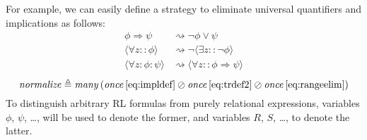 \documentclass{llncs}
\begin{document}
For example, we can easily define a strategy to eliminate universal
quantifiers and implications as follows:
\begin{align}
\phi \Rightarrow \psi & \rightsquigarrow \neg \phi \vee \psi \label{eq:impldef} \\
\langle \forall z :: \phi \rangle & \rightsquigarrow \neg \langle \exists z :: \neg \phi \rangle \label{eq:trdef2}\\
\langle \forall z : \phi : \psi \rangle & \rightsquigarrow \langle \forall z :: \phi \Rightarrow \psi \rangle \label{eq:rangeelim}
\end{align}
\begin{equation*}
\mathit{normalize} \triangleq \mathit{many} \, (\mathit{once} \, \eqref{eq:impldef} \oslash \mathit{once} \, \eqref{eq:trdef2} \oslash \mathit{once} \, \eqref{eq:rangeelim})
\end{equation*}
To distinguish arbitrary RL formulas from purely relational
expressions, variables $\phi$, $\psi$, \ldots, will be used to denote
the former, and variables $R$, $S$, \ldots, to denote the latter.
\end{document}
